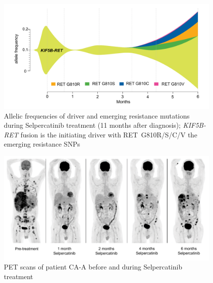 \begin{figure}[htp]
\centering
\includegraphics[width=.99\linewidth]{Figures/CASCADE/CA99/CA-A_ctDNAstream}
\caption[Allelic frequencies of driver and emerging resistance mutations]{Allelic frequencies of driver and emerging resistance mutations during Selpercatinib treatment (11 months after diagnosis); \textit{KIF5B-RET} fusion is the initiating driver with RET~G810R/S/C/V the emerging resistance SNPs} \label{fig:ca99ctDNA}
\end{figure}


\begin{figure}[hbp]
\centering
\includegraphics[width=.99\linewidth]{Figures/CASCADE/CA99/CA-A_PETscans}
\caption[PET scans of patient CA-A before and during Selpercatinib treatment]{PET scans of patient CA-A before and during Selpercatinib treatment} \label{fig:ca99pet}
\end{figure}


